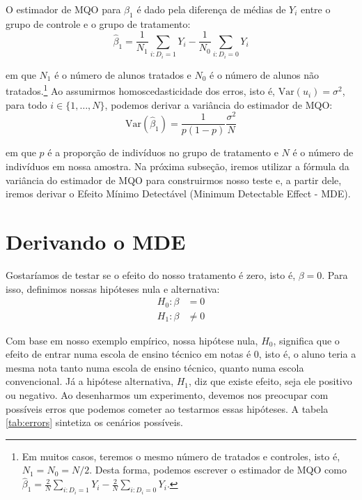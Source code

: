 O estimador de MQO para $\beta_1$ é dado pela diferença de médias de $Y_i$ entre o grupo de controle e o grupo de tratamento:
\begin{equation}
    \hat{\beta}_1 = \frac{1}{N_1}\sum_{i:D_i = 1} Y_i - \frac{1}{N_0}\sum_{i:D_i = 0} Y_i
\end{equation}

\noindent em que $N_1$ é o número de alunos tratados e 
$N_0$ é o número de alunos não tratados.\footnote{Em muitos casos, teremos o mesmo número de tratados e controles, isto é, $N_1 = N_0 = N/2$. Desta forma, podemos escrever o estimador de MQO como $\hat{\beta}_1 = \frac{2}{N}\sum_{i:D_i = 1} Y_i - \frac{2}{N}\sum_{i:D_i = 0} Y_i$.} Ao assumirmos homoscedasticidade dos erros, isto é, $\mathrm{Var}(u_i) = \sigma^2$, para todo $i \in \{1,\dots,N\}$, podemos derivar a variância do estimador de MQO:
\begin{equation}\label{varbeta}
    \mathrm{Var}(\hat{\beta}_1) = \frac{1}{p(1-p)}\frac{\sigma^2}{N} 
\end{equation}

\noindent em que $p$ é a proporção de indivíduos no grupo de tratamento e $N$ é o número de indivíduos em nossa amostra. Na próxima subseção, iremos utilizar a fórmula da variância do estimador de MQO para construirmos nosso teste e, a partir dele, iremos derivar o Efeito Mínimo Detectável (Minimum Detectable Effect - MDE).


\section{Derivando o MDE}

Gostaríamos de testar se o efeito do nosso tratamento é zero, isto é, $\beta = 0$. Para isso, definimos nossas hipóteses nula e alternativa:
\begin{align*}
        H_0: \beta & = 0\\
        H_1: \beta & \neq 0
    \end{align*}

Com base em nosso exemplo empírico, nossa hipótese nula, $H_0$, significa que o efeito de entrar numa escola de ensino técnico em notas é 0, isto é, o aluno teria a mesma nota tanto numa escola de ensino técnico, quanto numa escola convencional. Já a hipótese alternativa, $H_1$, diz que existe efeito, seja ele positivo ou negativo. Ao desenharmos um experimento, devemos nos preocupar com possíveis erros que podemos cometer ao testarmos essas hipóteses. A tabela \ref{tab:errors} sintetiza os cenários possíveis. 

